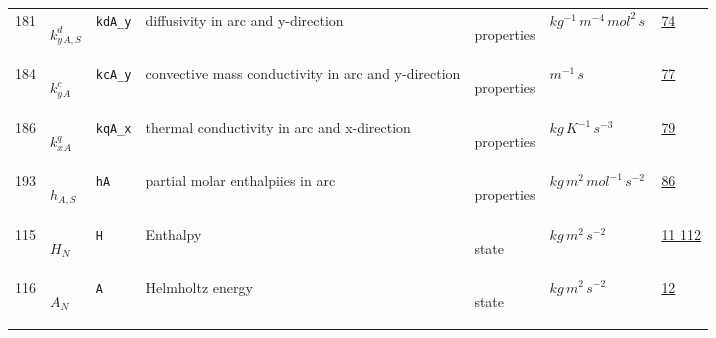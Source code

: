 \begin{longtable}{|p{1cm}|p{2.5cm}|p{4.5cm}|p{8cm}|p{3.0cm}|p{3cm}|p{1cm}|}
                 \\
            181
             & \hypertarget{"v:181"}{ $ {{k^d_y}}{_{A, S}} $}
             & \verb|kdA_y|
             & diffusivity in arc and y-direction
             & \begin{lay}properties \end{lay}
             & $ kg^{-1} \,m^{-4} \,mol^{2} \,s \, $
             &                 \hyperlink{"e:74"}{ 74 }
                 \\
            184
             & \hypertarget{"v:184"}{ $ {{k^c_y}}{_{A}} $}
             & \verb|kcA_y|
             & convective mass conductivity in arc and y-direction
             & \begin{lay}properties \end{lay}
             & $ m^{-1} \,s \, $
             &                 \hyperlink{"e:77"}{ 77 }
                 \\
            186
             & \hypertarget{"v:186"}{ $ {{k^q_x}}{_{A}} $}
             & \verb|kqA_x|
             & thermal conductivity in arc and x-direction
             & \begin{lay}properties \end{lay}
             & $ kg \,K^{-1} \,s^{-3} \, $
             &                 \hyperlink{"e:79"}{ 79 }
                 \\
            193
             & \hypertarget{"v:193"}{ $ {h}{_{A, S}} $}
             & \verb|hA|
             & partial molar enthalpiies in arc
             & \begin{lay}properties \end{lay}
             & $ kg \,m^{2} \,mol^{-1} \,s^{-2} \, $
             &                 \hyperlink{"e:86"}{ 86 }
                 \\
            115
             & \hypertarget{"v:115"}{ $ {H}{_{N}} $}
             & \verb|H|
             & Enthalpy
             & \begin{lay}state \end{lay}
             & $ kg \,m^{2} \,s^{-2} \, $
             &                 \hyperlink{"e:11"}{ 11 }
                                 \hyperlink{"e:112"}{ 112 }
                 \\
            116
             & \hypertarget{"v:116"}{ $ {A}{_{N}} $}
             & \verb|A|
             & Helmholtz energy
             & \begin{lay}state \end{lay}
             & $ kg \,m^{2} \,s^{-2} \, $
             &                 \hyperlink{"e:12"}{ 12 }

\end{longtable}
